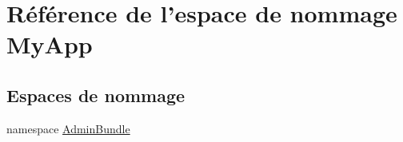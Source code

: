 \hypertarget{namespace_my_app}{\section{Référence de l'espace de nommage My\-App}
\label{namespace_my_app}
}
\subsection*{Espaces de nommage}
\begin{DoxyCompactItemize}
\item 
namespace \hyperlink{namespace_my_app_1_1_admin_bundle}{Admin\-Bundle}
\end{DoxyCompactItemize}
